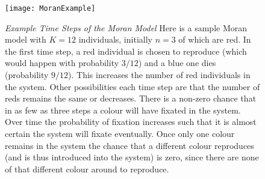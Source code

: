 \begin{figure}[h]
	\centering
	\texttt{[image: MoranExample]}
	\caption{\emph{Example Time Steps of the Moran Model} Here is a sample Moran model with $K=12$ individuals, initially $n=3$ of which are red. In the first time step, a red individual is chosen to reproduce (which would happen with probability $3/12$) and a blue one dies (probability $9/12$). This increases the number of red individuals in the system. Other possibilities each time step are that the number of reds remains the same or decreases. There is a non-zero chance that in as few as three steps a colour will have fixated in the system. Over time the probability of fixation increases such that it is almost certain the system will fixate eventually. Once only one colour remains in the system the chance that a different colour reproduces (and is thus introduced into the system) is zero, since there are none of that different colour around to reproduce. } \label{Moranfig} %
\end{figure}

